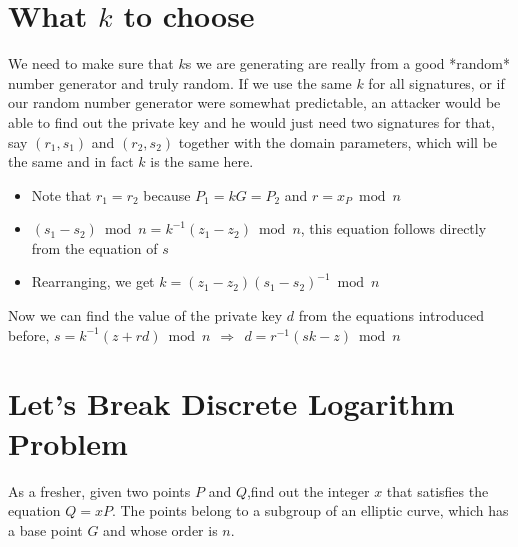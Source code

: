 \documentclass{article}
\begin{document}
\section{What $k$ to choose}
We need to make sure that $k$s we are generating are really from a good *random* number generator and truly random.
If we use the same $k$ for all signatures, or if our random number generator were somewhat predictable, an attacker would be able to find out the private key and he would just need two signatures for that, say $(r_1,s_1)$ and $(r_2,s_2)$
together with the domain parameters, which will be the same and in fact $k$ is the same here. 
\begin{itemize}
    \item Note that $r_1 = r_2$ because $P_1=kG=P_2$ and $r = x_P \bmod{n}$ 
    \item $(s_1 - s_2) \bmod{n} = k^{-1} (z_1 - z_2) \bmod{n}$, this equation follows directly from the equation of $s$
    \item Rearranging, we get $k = (z_1 - z_2)(s_1 - s_2)^{-1} \bmod{n}$
\end{itemize}
Now we can find the value of the private key $d$ from the equations introduced before, $s = k^{-1}(z + rd) \bmod{n}\ \ \Rightarrow\ \ d = r^{-1} (sk - z) \bmod{n}$ 
\section{Let's Break Discrete Logarithm Problem}
As a fresher, given two points $P$ and $Q$,find out the integer $x$ that satisfies the equation $Q=xP$. The points belong to a subgroup of an elliptic curve, which has a base point $G$ and whose order is $n$.
\end{document}
